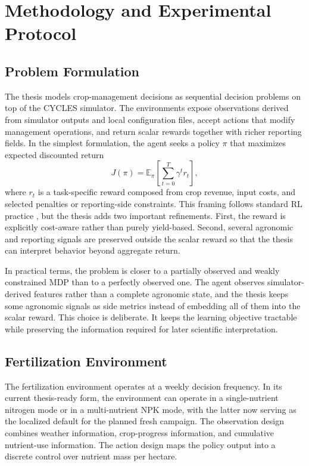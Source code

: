 \chapter{Methodology and Experimental Protocol}

\section{Problem Formulation}

The thesis models crop-management decisions as sequential decision problems on top of the CYCLES simulator. The environments expose observations derived from simulator outputs and local configuration files, accept actions that modify management operations, and return scalar rewards together with richer reporting fields. In the simplest formulation, the agent seeks a policy $\pi$ that maximizes expected discounted return
\begin{equation}
J(\pi) = \mathbb{E}_{\pi}\left[\sum_{t=0}^{T} \gamma^t r_t\right],
\end{equation}
where $r_t$ is a task-specific reward composed from crop revenue, input costs, and selected penalties or reporting-side constraints. This framing follows standard RL practice \citep{sutton2018rl}, but the thesis adds two important refinements. First, the reward is explicitly cost-aware rather than purely yield-based. Second, several agronomic and reporting signals are preserved outside the scalar reward so that the thesis can interpret behavior beyond aggregate return.

In practical terms, the problem is closer to a partially observed and weakly constrained MDP than to a perfectly observed one. The agent observes simulator-derived features rather than a complete agronomic state, and the thesis keeps some agronomic signals as side metrics instead of embedding all of them into the scalar reward. This choice is deliberate. It keeps the learning objective tractable while preserving the information required for later scientific interpretation.

\section{Fertilization Environment}

The fertilization environment operates at a weekly decision frequency. In its current thesis-ready form, the environment can operate in a single-nutrient nitrogen mode or in a multi-nutrient NPK mode, with the latter now serving as the localized default for the planned fresh campaign. The observation design combines weather information, crop-progress information, and cumulative nutrient-use information. The action design maps the policy output into a discrete control over nutrient mass per hectare.

